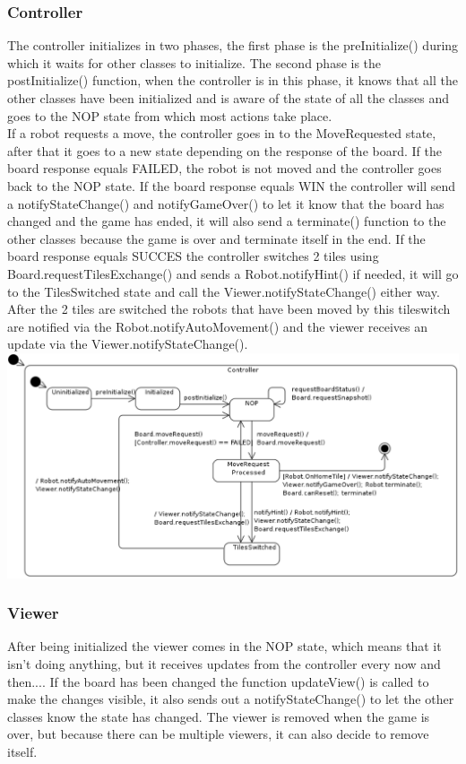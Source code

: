	\subsubsection{Controller}
	The controller initializes in two phases, the first phase is the preInitialize() during which it waits for other classes to initialize. The second phase is the postInitialize() function, when the controller is in this phase, it knows that all the other classes have been initialized and is aware of the state of all the classes and goes to the NOP state from which most actions take place.\\
If a robot requests a move, the controller goes in to the MoveRequested state, after that it goes to a new state depending on the response of the board. If the board response equals FAILED, the robot is not moved and the controller goes back to the NOP state. If the board response equals WIN the controller will send a notifyStateChange() and notifyGameOver() to let it know that the board has changed and the game has ended, it will also send a terminate() function to the other classes because the game is over and terminate itself in the end. If the board response equals SUCCES the controller switches 2 tiles using Board.requestTilesExchange() and sends a Robot.notifyHint() if needed, it will go to the TilesSwitched state and call the Viewer.notifyStateChange() either way.\\
After the 2 tiles are switched the robots that have been moved by this tileswitch are notified via the Robot.notifyAutoMovement() and the viewer receives an update via the Viewer.notifyStateChange().\\


	\includegraphics[width=\linewidth]{statecharts/controller.pdf}

	\subsubsection{Viewer}
	After being initialized the viewer comes in the NOP state, which means that it isn't doing anything, but it receives updates from the controller every now and then.... If the board has been changed the function updateView() is called to make the changes visible, it also sends out a notifyStateChange() to let the other classes know the state has changed. The viewer is removed when the game is over, but because there can be multiple viewers, it can also decide to remove itself.
	
